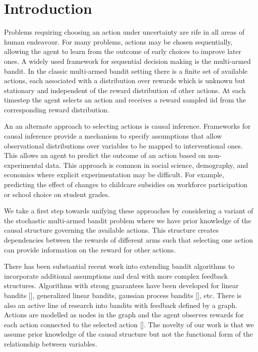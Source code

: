 \documentclass{article}
\theoremstyle{plain}
\theoremstyle{definition}
\begin{document}

\section*{Introduction}

Problems requiring choosing an action under uncertainty are rife in all areas of human endeavour. For many problems, actions may be chosen sequentially, allowing the agent to learn from the outcome of early choices to improve later ones. A widely used framework for sequential decision making is the multi-armed bandit. In the classic multi-armed bandit setting there is a finite set of available actions, each associated with a distribution over rewards which is unknown but stationary and independent of the reward distribution of other actions. At each timestep the agent selects an action and receives a reward sampled iid from the corresponding reward distribution.  

An an alternate approach to selecting actions is causal inference. Frameworks for causal inference provide a mechanism to specify assumptions that allow observational distributions over variables to be mapped to interventional ones. This allows an agent to predict the outcome of an action based on non-experimental data. This approach is common in social science, demography, and economics where explicit experimentation may be difficult. For example, predicting the effect of changes to childcare subsidies on workforce participation or school choice on student grades. 

We take a first step towards unifying these approaches by considering a variant of the stochastic multi-armed bandit problem where we have prior knowledge of the causal structure governing the available actions. This structure creates dependencies between the rewards of different arms such that selecting one action can provide information on the reward for other actions. 

There has been substantial recent work into extending bandit algorithms to incorporate additional assumptions and deal with more complex feedback structures. Algorithms with strong guarantees have been developed for linear bandits [], generalized linear bandits, gaussian process bandits [], etc. There is also an active line of research into bandits with feedback defined by a graph. Actions are modelled as nodes in the graph and the agent observes rewards for each action connected to the selected action []. The novelty of our work is that we assume prior knowledge of the causal structure but not the functional form of the relationship between variables. 
\end{document}
